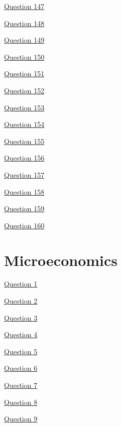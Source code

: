 \documentclass[12pt,a4paper]{article}
\begin{document}
\href{https://qr.ae/p2Hulx}{Question 147}

\href{https://qr.ae/pGzqJI}{Question 148}

\href{https://qr.ae/pGzqVF}{Question 149}

\href{https://qr.ae/pGL81h}{Question 150}

\href{https://qr.ae/prbKqE}{Question 151}

\href{https://qr.ae/p2HuBb}{Question 152}

\href{https://qr.ae/p2HuQb}{Question 153}

\href{https://qr.ae/p2Hud0}{Question 154}

\href{https://math.stackexchange.com/a/3816929/378131}{Question 155}

\href{https://qr.ae/pGzqJI}{Question 156}

\href{https://qr.ae/pGzqVF}{Question 157}

\href{https://qr.ae/py8SX6}{Question 158}

\href{https://qr.ae/pyR8ZG}{Question 159}

\href{https://economics.stackexchange.com/a/59170/11824}{Question 160}


\section{Microeconomics} 

\href{https://x.com/econschool2/status/1720601001520931244?s=46&t=IZNzZqVBI7BccLAm69rw3w}{Question 1}

\href{https://x.com/econschool2/status/1720601166327714168?s=46&t=IZNzZqVBI7BccLAm69rw3w}{Question 2}

\href{https://economics.stackexchange.com/a/21779/11824}{Question 3}

\href{https://x.com/amit_k_goyal/status/1652865058135851010?s=46&t=IZNzZqVBI7BccLAm69rw3w}{Question 4}

\href{https://x.com/amit_k_goyal/status/1653334490482089986?s=46&t=IZNzZqVBI7BccLAm69rw3w}{Question 5}

\href{https://x.com/amit_k_goyal/status/1660978664467562497?s=46&t=IZNzZqVBI7BccLAm69rw3w}{Question 6}

\href{https://x.com/amit_k_goyal/status/1683858989925253122?s=46&t=IZNzZqVBI7BccLAm69rw3w}{Question 7}

\href{https://x.com/amit_k_goyal/status/1688234916855549952?s=46&t=IZNzZqVBI7BccLAm69rw3w}{Question 8}

\href{https://x.com/amit_k_goyal/status/1698552986224467994?s=46&t=IZNzZqVBI7BccLAm69rw3w}{Question 9}
\end{document}
